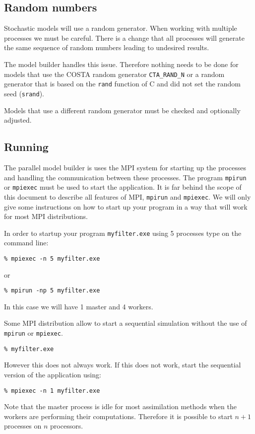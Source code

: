\subsection{Random numbers}
Stochastic models will use a random generator. When working with multiple
processes we must be careful. There is a change that all processes will
generate the same sequence of random numbers leading to undesired results. 

The model builder handles this issue. Therefore nothing needs to be done
for models that use the COSTA random generator
{\tt CTA\_RAND\_N} or a random generator that is based on the {\tt rand}
function of C and did not set the random seed ({\tt srand}).

Models that use a different random generator must be checked and optionally
adjusted.

\subsection{Running}
The parallel model builder is uses the MPI system for starting up the
processes and handling the communication between these processes. The
program {\tt mpirun} or {\tt mpiexec} must be used to start the
application.  It is far behind the scope of this document to describe all
features of MPI, {\tt mpirun} and {\tt mpiexec}. We will only give some
instructions on how to start up your program in a way that will work for
most MPI distributions.

In order to startup your program {\tt myfilter.exe} using 5
processes type on the command line:
\begin{verbatim}
% mpiexec -n 5 myfilter.exe
\end{verbatim}
or 
\begin{verbatim}
% mpirun -np 5 myfilter.exe
\end{verbatim}
In this case we will have 1 master and 4 workers.

Some MPI distribution allow to start a sequential simulation without the
use of {\tt mpirun} or {\tt mpiexec}. 
\begin{verbatim}
% myfilter.exe
\end{verbatim}
However this does not always work. If this does not work, start the
sequential version of the application using:
\begin{verbatim}
% mpiexec -n 1 myfilter.exe
\end{verbatim}

Note that the master process is idle for most assimilation methods when the
workers are performing their computations. Therefore it is possible to
start $n+1$ processes on $n$ processors.

